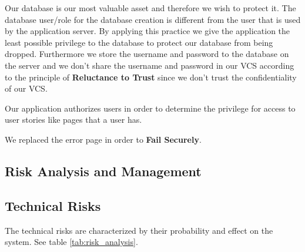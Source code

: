 \documentclass[a4paper]{article}
\begin{document}
Our database is our most valuable asset and therefore we wish to protect it. The database user/role for the database creation is different from the user that is used by the application server. By applying this practice we give the application the least possible privilege to the database to protect our database from being dropped. Furthermore we store the username and password to the database on the server and we don't share the username and password in our VCS according to the principle of \textbf{Reluctance to Trust} since we don't trust the confidentiality of our VCS.

Our application authorizes users in order to determine the privilege for access to user stories like pages that a user has.

We replaced the error page in order to \textbf{Fail Securely}.

\subsection{Risk Analysis and Management}

\subsection{Technical Risks}
The technical risks are characterized by their probability and effect on the system. See table \ref{tab:risk_analysis}.
\end{document}
